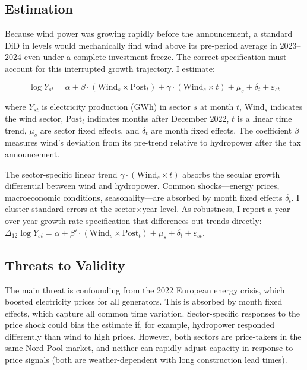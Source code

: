 \documentclass[12pt]{article}
\begin{document}
\subsection{Estimation}

Because wind power was growing rapidly before the announcement, a standard DiD in levels would mechanically find wind above its pre-period average in 2023--2024 even under a complete investment freeze. The correct specification must account for this interrupted growth trajectory. I estimate:

\begin{equation}
\log Y_{st} = \alpha + \beta \cdot (\text{Wind}_s \times \text{Post}_t) + \gamma \cdot (\text{Wind}_s \times t) + \mu_s + \delta_t + \varepsilon_{st}
\label{eq:main}
\end{equation}

\noindent where $Y_{st}$ is electricity production (GWh) in sector $s$ at month $t$, $\text{Wind}_s$ indicates the wind sector, $\text{Post}_t$ indicates months after December 2022, $t$ is a linear time trend, $\mu_s$ are sector fixed effects, and $\delta_t$ are month fixed effects. The coefficient $\beta$ measures wind's deviation from its pre-trend relative to hydropower after the tax announcement.

The sector-specific linear trend $\gamma \cdot (\text{Wind}_s \times t)$ absorbs the secular growth differential between wind and hydropower. Common shocks---energy prices, macroeconomic conditions, seasonality---are absorbed by month fixed effects $\delta_t$. I cluster standard errors at the sector$\times$year level. As robustness, I report a year-over-year growth rate specification that differences out trends directly: $\Delta_{12}\log Y_{st} = \alpha + \beta' \cdot (\text{Wind}_s \times \text{Post}_t) + \mu_s + \delta_t + \varepsilon_{st}$.

\subsection{Threats to Validity}

The main threat is confounding from the 2022 European energy crisis, which boosted electricity prices for all generators. This is absorbed by month fixed effects, which capture all common time variation. Sector-specific responses to the price shock could bias the estimate if, for example, hydropower responded differently than wind to high prices. However, both sectors are price-takers in the same Nord Pool market, and neither can rapidly adjust capacity in response to price signals (both are weather-dependent with long construction lead times).
\end{document}
